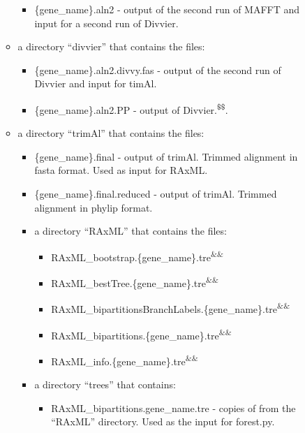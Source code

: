 \documentclass{article}
\begin{document}
\begin{enumerate}[itemsep=12pt]
\begin{description}
\begin{itemize}
            \begin{itemize}
                \item \{gene\_name\}.aln2 - output of  the second run of MAFFT and input for a second run of Divvier.
            \end{itemize}
        \item a directory “divvier” that contains the files:
            \begin{itemize}
                \item \{gene\_name\}.aln2.divvy.fas - output of the second run of Divvier and input for timAl.
                \item \{gene\_name\}.aln2.PP - output of Divvier.\textsuperscript{\$\$}.
            \end{itemize}
            \item a directory “trimAl” that contains the files:
            \begin{itemize}
                \item \{gene\_name\}.final - output of trimAl. Trimmed alignment in fasta format. Used as input for RAxML.
                \item \{gene\_name\}.final.reduced - output of trimAl. Trimmed alignment in phylip format.
            \end{itemize}
            \begin{itemize}
                \item a directory “RAxML” that contains the files:
                \begin{itemize}
                    \item RAxML\_bootstrap.\{gene\_name\}.tre\textsuperscript{\&\&}
                    \item RAxML\_bestTree.\{gene\_name\}.tre\textsuperscript{\&\&}
                    \item RAxML\_bipartitionsBranchLabels.\{gene\_name\}.tre\textsuperscript{\&\&}
                    \item RAxML\_bipartitions.\{gene\_name\}.tre\textsuperscript{\&\&}
                    \item RAxML\_info.\{gene\_name\}.tre\textsuperscript{\&\&}
                \end{itemize}
                \item a directory “trees” that contains:
                \begin{itemize}
                    \item RAxML\_bipartitions.{gene\_name}.tre - copies of from the “RAxML” directory. Used as the input for forest.py.

\end{itemize}
\end{itemize}
\end{itemize}
\end{description}
\end{enumerate}
\end{document}
